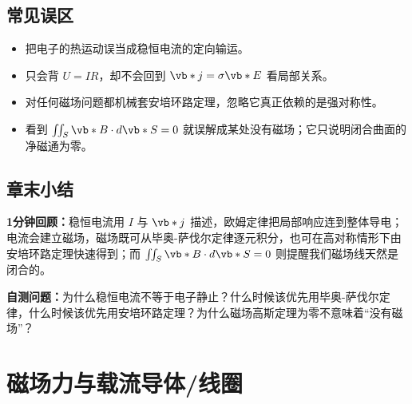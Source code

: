 \documentclass[lang=cn,11pt]{elegantbook}
\newcommand{\summaryline}[1]{\par\noindent\textbf{1分钟回顾：}#1\par}
\newcommand{\chapterselfcheck}[1]{\par\noindent\textbf{自测问题：}#1\par}
\begin{document}
\section{常见误区}

\begin{itemize}
 \item 把电子的热运动误当成稳恒电流的定向输运。
 \item 只会背 \(U=IR\)，却不会回到 \(\vb*{j}=\sigma\vb*{E}\) 看局部关系。
 \item 对任何磁场问题都机械套安培环路定理，忽略它真正依赖的是强对称性。
 \item 看到 \(\iint_S \vb*{B}\cdot d\vb*{S}=0\) 就误解成某处没有磁场；它只说明闭合曲面的净磁通为零。
\end{itemize}

\section{章末小结}

\summaryline{稳恒电流用 \(I\) 与 \(\vb*{j}\) 描述，欧姆定律把局部响应连到整体导电；电流会建立磁场，磁场既可从毕奥-萨伐尔定律逐元积分，也可在高对称情形下由安培环路定理快速得到；而 \(\iint_S \vb*{B}\cdot d\vb*{S}=0\) 则提醒我们磁场线天然是闭合的。}
\chapterselfcheck{为什么稳恒电流不等于电子静止？什么时候该优先用毕奥-萨伐尔定律，什么时候该优先用安培环路定理？为什么磁场高斯定理为零不意味着“没有磁场”？}

\chapter{磁场力与载流导体/线圈}
\end{document}
